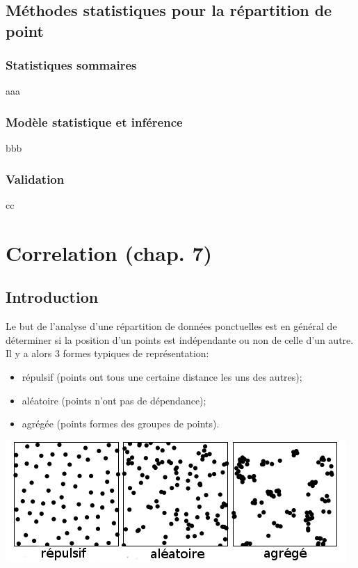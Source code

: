 \documentclass[french,12pt,a4paper]{report}
\begin{document}

\section{Méthodes statistiques pour la répartition de point}

\subsection{Statistiques sommaires}
aaa\\

\subsection{Modèle statistique et inférence}
bbb\\

\subsection{Validation}
cc\\


\chapter{Correlation (chap. 7)}

\section{Introduction}

Le but de l'analyse d'une répartition de données ponctuelles est en général de déterminer si la position d'un points est indépendante ou non de celle d'un autre. Il y a alors 3 formes typiques de représentation:
\begin{itemize}
\item répulsif (points ont tous une certaine distance les uns des autres);
\item aléatoire (points n'ont pas de dépendance);
\item agrégée (points formes des groupes de points).\\
\end{itemize}

\begin{center} \includegraphics[scale=0.8]{images/repartition.png} \end{center}
\end{document}
